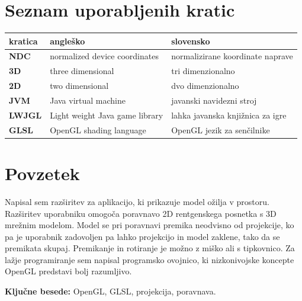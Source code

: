 \documentclass[a4paper, 12pt]{book}
\newcommand{\tkeywords}{OpenGL, GLSL, projekcija, poravnava}
\newcommand{\clearemptydoublepage}{\newpage{\pagestyle{empty}\cleardoublepage}}
\begin{document}
\def\thepage{}%
\tableofcontents{}


\clearemptydoublepage


\chapter*{Seznam uporabljenih kratic}

\begin{tabular}{l|l|l}
  {\bf kratica} & {\bf angleško} & {\bf slovensko} \\ \hline
  {\bf NDC} & normalized device coordinates & normalizirane koordinate naprave \\
  {\bf 3D} & three dimensional & tri dimenzionalno \\
  {\bf 2D} & two dimensional & dvo dimenzionalno \\
  {\bf JVM} & Java virtual machine & javanski navidezni stroj \\
  {\bf LWJGL} & Light weight Java game library & lahka javanska knjižnica za igre \\
  {\bf GLSL} & OpenGL shading language & OpenGL jezik za senčilnike \\
\end{tabular}



\clearemptydoublepage

\chapter*{Povzetek}
Napisal sem razširitev za aplikacijo, ki prikazuje model ožilja v prostoru. Razširitev uporabniku omogoča poravnavo 2D rentgenskega posnetka s 3D mrežnim modelom. Model se pri poravnavi premika neodvisno od projekcije, ko pa je uporabnik zadovoljen pa lahko projekcijo in model zaklene, tako da se premikata skupaj. Premikanje in rotiranje je možno z miško ali s tipkovnico. Za lažje programiranje sem napisal programsko ovojnico, ki nizkonivojske koncepte OpenGL predstavi bolj razumljivo.

\bigskip

\noindent\textbf{Ključne besede: } \tkeywords.
\clearemptydoublepage
\end{document}
